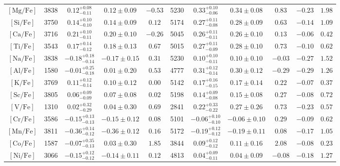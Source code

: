 \begin{table*}
\begin{tabular}{c|cccc|cccc|cc}
$\mathrm{[Mg/Fe]}$ & 3838 & $0.12_{-0.11}^{+0.08}$ & $0.12 \pm 0.09$ & $-0.53$ & 5230 & $0.33_{-0.06}^{+0.10}$ & $0.34 \pm 0.08$ & $0.83$ & $-0.23$ & $1.98$  \\
$\mathrm{[Si/Fe]}$ & 3750 & $0.14_{-0.10}^{+0.10}$ & $0.14 \pm 0.09$ & $0.12$ & 5174 & $0.27_{-0.08}^{+0.11}$ & $0.28 \pm 0.09$ & $0.63$ & $-0.14$ & $1.09$  \\
$\mathrm{[Ca/Fe]}$ & 3716 & $0.21_{-0.11}^{+0.10}$ & $0.20 \pm 0.10$ & $-0.26$ & 5045 & $0.26_{-0.11}^{+0.11}$ & $0.26 \pm 0.10$ & $0.13$ & $-0.06$ & $0.42$  \\
$\mathrm{[Ti/Fe]}$ & 3543 & $0.17_{-0.12}^{+0.14}$ & $0.18 \pm 0.13$ & $0.67$ & 5015 & $0.27_{-0.09}^{+0.11}$ & $0.28 \pm 0.10$ & $0.73$ & $-0.10$ & $0.62$  \\
\hline
$\mathrm{[Na/Fe]}$ & 3838 & $-0.18_{-0.14}^{+0.18}$ & $-0.17 \pm 0.15$ & $0.31$ & 5230 & $0.10_{-0.11}^{+0.10}$ & $0.10 \pm 0.10$ & $-0.03$ & $-0.27$ & $1.52$  \\
$\mathrm{[Al/Fe]}$ & 1580 & $-0.01_{-0.18}^{+0.25}$ & $0.01 \pm 0.20$ & $0.53$ & 4777 & $0.31_{-0.14}^{+0.12}$ & $0.30 \pm 0.12$ & $-0.29$ & $-0.29$ & $1.26$  \\
$\mathrm{[K/Fe]}$ & 3769 & $0.11_{-0.14}^{+0.12}$ & $0.10 \pm 0.12$ & $0.00$ & 5142 & $0.17_{-0.15}^{+0.16}$ & $0.17 \pm 0.14$ & $0.22$ & $-0.07$ & $0.37$  \\
\hline
$\mathrm{[Sc/Fe]}$ & 3805 & $0.06_{-0.09}^{+0.09}$ & $0.07 \pm 0.08$ & $0.02$ & 5198 & $0.14_{-0.08}^{+0.09}$ & $0.15 \pm 0.08$ & $0.27$ & $-0.08$ & $0.72$  \\
$\mathrm{[V/Fe]}$ & 1310 & $0.02_{-0.29}^{+0.32}$ & $0.04 \pm 0.30$ & $0.69$ & 2841 & $0.22_{-0.22}^{+0.33}$ & $0.27 \pm 0.26$ & $0.73$ & $-0.23$ & $0.57$  \\
$\mathrm{[Cr/Fe]}$ & 3586 & $-0.15_{-0.13}^{+0.13}$ & $-0.15 \pm 0.12$ & $0.08$ & 5101 & $-0.06_{-0.10}^{+0.10}$ & $-0.06 \pm 0.10$ & $0.29$ & $-0.09$ & $0.62$  \\
$\mathrm{[Mn/Fe]}$ & 3811 & $-0.36_{-0.12}^{+0.14}$ & $-0.36 \pm 0.12$ & $0.16$ & 5172 & $-0.19_{-0.12}^{+0.12}$ & $-0.19 \pm 0.11$ & $0.08$ & $-0.17$ & $1.05$  \\
$\mathrm{[Co/Fe]}$ & 1587 & $-0.07_{-0.13}^{+0.35}$ & $0.03 \pm 0.30$ & $1.85$ & 3844 & $0.09_{-0.12}^{+0.12}$ & $0.11 \pm 0.16$ & $2.08$ & $-0.08$ & $0.23$  \\
$\mathrm{[Ni/Fe]}$ & 3066 & $-0.15_{-0.12}^{+0.12}$ & $-0.14 \pm 0.11$ & $0.12$ & 4813 & $0.04_{-0.11}^{+0.09}$ & $0.04 \pm 0.09$ & $-0.08$ & $-0.18$ & $1.27$  \\

\end{tabular}
\end{table*}

